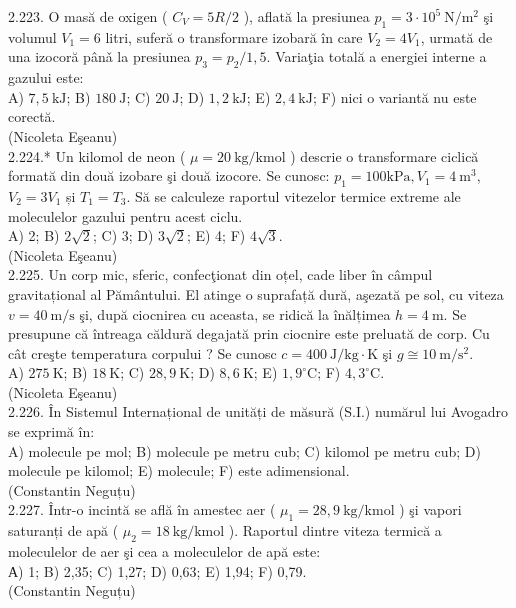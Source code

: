 \documentclass[10pt]{article}
\begin{document}
2.223. O masă de oxigen ( $C_{V}=5 R / 2$ ), aflată la presiunea $p_{1}=3 \cdot 10^{5} \mathrm{~N} / \mathrm{m}^{2}$ şi volumul $V_{1}=6$ litri, suferă o transformare izobară în care $V_{2}=4 V_{1}$, urmată de una izocoră pânǎ la presiunea $p_{3}=p_{2} / 1,5$. Variaţia totală a energiei interne a gazului este:\\ A) $7,5 \mathrm{~kJ}$; B) $180 \mathrm{~J}$; C) $20 \mathrm{~J}$; D) $1,2 \mathrm{~kJ}$; E) $2,4 \mathrm{~kJ}$; F) nici o variantă nu este corectă.\\ (Nicoleta Eşeanu)\\

2.224.* Un kilomol de neon ( $\mu=20 \mathrm{~kg} / \mathrm{kmol}$ ) descrie o transformare ciclică formată din două izobare şi două izocore. Se cunosc: $p_{1}=100 \mathrm{kPa}, V_{1}=4 \mathrm{~m}^{3}$, $V_{2}=3 V_{1}$ și $T_{1}=T_{3}$. Să se calculeze raportul vitezelor termice extreme ale moleculelor gazului pentru acest ciclu.\\ A) 2; B) $2 \sqrt{2}$; C) 3; D) $3 \sqrt{2}$; E) 4; F) $4 \sqrt{3}$.\\ (Nicoleta Eşeanu)\\

2.225. Un corp mic, sferic, confecţionat din oțel, cade liber în câmpul gravitațional al Pământului. El atinge o suprafață dură, aşezată pe sol, cu viteza $v=40 \mathrm{~m} / \mathrm{s}$ şi, după ciocnirea cu aceasta, se ridică la înălțimea $h=4 \mathrm{~m}$. Se presupune că întreaga căldură degajată prin ciocnire este preluată de corp. Cu cât creşte temperatura corpului ? Se cunosc $c=400 \mathrm{~J} / \mathrm{kg} \cdot \mathrm{K}$ şi $g \cong 10 \mathrm{~m} / \mathrm{s}^{2}$.\\ A) $275 \mathrm{~K}$; B) $18 \mathrm{~K}$; C) $28,9 \mathrm{~K}$; D) $8,6 \mathrm{~K}$; E) $1,9^{\circ} \mathrm{C}$; F) $4,3^{\circ} \mathrm{C}$.\\ (Nicoleta Eşeanu)\\

2.226. În Sistemul Internațional de unități de măsură (S.I.) numărul lui Avogadro se exprimă în:\\ A) molecule pe mol; B) molecule pe metru cub; C) kilomol pe metru cub; D) molecule pe kilomol; E) molecule; F) este adimensional.\\ (Constantin Neguțu)\\

2.227. Într-o incintă se află în amestec aer ( $\mu_{1}=28,9 \mathrm{~kg} / \mathrm{kmol}$ ) şi vapori saturanți de apă ( $\mu_{2}=18 \mathrm{~kg} / \mathrm{kmol}$ ). Raportul dintre viteza termică a moleculelor de aer şi cea a moleculelor de apă este:\\ А) 1; B) 2,35; C) 1,27; D) 0,63; E) 1,94; F) 0,79.\\ (Constantin Neguțu)\\
\end{document}
